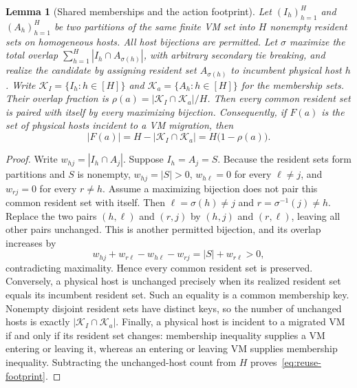 \documentclass[11pt]{article}
\newtheorem{lemma}{Lemma}
\begin{document}
\begin{lemma}[Shared memberships and the action footprint]\label{lem:reuse-footprint}
Let $(I_h)_{h=1}^H$ and $(A_h)_{h=1}^H$ be two partitions of the same finite VM set into $H$ nonempty resident sets on homogeneous hosts. All host bijections are permitted. Let $\sigma$ maximize the total overlap $\sum_{h=1}^H |I_h\cap A_{\sigma(h)}|$, with arbitrary secondary tie breaking, and realize the candidate by assigning resident set $A_{\sigma(h)}$ to incumbent physical host $h$. Write $\mathcal K_I=\{I_h:h\in[H]\}$ and $\mathcal K_a=\{A_h:h\in[H]\}$ for the membership sets. Their overlap fraction is $\rho(a)=|\mathcal K_I\cap\mathcal K_a|/H$. Then every common resident set is paired with itself by every maximizing bijection. Consequently, if $F(a)$ is the set of physical hosts incident to a VM migration, then
\begin{equation}\label{eq:reuse-footprint}
 |F(a)|=H-|\mathcal K_I\cap\mathcal K_a|=H\bigl(1-\rho(a)\bigr).
\end{equation}
\end{lemma}
\begin{proof}
Write $w_{hj}=|I_h\cap A_j|$. Suppose $I_h=A_j=S$. Because the resident sets form partitions and $S$ is nonempty, $w_{hj}=|S|>0$, $w_{h\ell}=0$ for every $\ell\ne j$, and $w_{rj}=0$ for every $r\ne h$. Assume a maximizing bijection does not pair this common resident set with itself. Then $\ell=\sigma(h)\ne j$ and $r=\sigma^{-1}(j)\ne h$. Replace the two pairs $(h,\ell)$ and $(r,j)$ by $(h,j)$ and $(r,\ell)$, leaving all other pairs unchanged. This is another permitted bijection, and its overlap increases by
\begin{equation}
 w_{hj}+w_{r\ell}-w_{h\ell}-w_{rj}=|S|+w_{r\ell}>0,
\end{equation}
contradicting maximality. Hence every common resident set is preserved. Conversely, a physical host is unchanged precisely when its realized resident set equals its incumbent resident set. Such an equality is a common membership key. Nonempty disjoint resident sets have distinct keys, so the number of unchanged hosts is exactly $|\mathcal K_I\cap\mathcal K_a|$. Finally, a physical host is incident to a migrated VM if and only if its resident set changes: membership inequality supplies a VM entering or leaving it, whereas an entering or leaving VM supplies membership inequality. Subtracting the unchanged-host count from $H$ proves~\eqref{eq:reuse-footprint}.
\end{proof}
\end{document}
